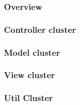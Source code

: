 \subsubsection{Overview}

\subsubsection{Controller cluster}

\subsubsection{Model cluster}

\subsubsection{View cluster}

\subsubsection{Util Cluster}

